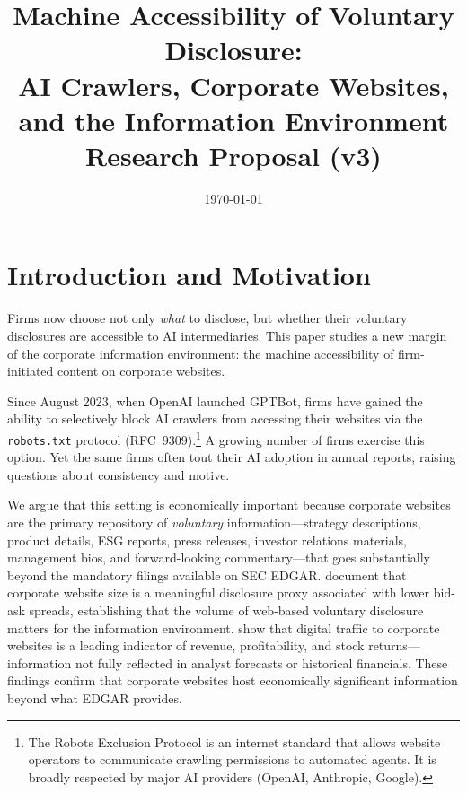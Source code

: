 \documentclass[12pt,a4paper]{article}
\title{\textbf{Machine Accessibility of Voluntary Disclosure: \\ AI Crawlers, Corporate Websites, and the Information Environment}\\
\vspace{0.5cm}
\large Research Proposal (v3)}
\author{}
\date{\today}
\begin{document}
\maketitle

\section{Introduction and Motivation}

Firms now choose not only \emph{what} to disclose, but whether their voluntary disclosures are accessible to AI intermediaries. This paper studies a new margin of the corporate information environment: the machine accessibility of firm-initiated content on corporate websites.

Since August 2023, when OpenAI launched GPTBot, firms have gained the ability to selectively block AI crawlers from accessing their websites via the \texttt{robots.txt} protocol (RFC~9309).\footnote{The Robots Exclusion Protocol is an internet standard that allows website operators to communicate crawling permissions to automated agents. It is broadly respected by major AI providers (OpenAI, Anthropic, Google).} A growing number of firms exercise this option. Yet the same firms often tout their AI adoption in annual reports, raising questions about consistency and motive.

We argue that this setting is economically important because corporate websites are the primary repository of \emph{voluntary} information---strategy descriptions, product details, ESG reports, press releases, investor relations materials, management bios, and forward-looking commentary---that goes substantially beyond the mandatory filings available on SEC EDGAR. \citet{BoullandBourveauBreuer2025} document that corporate website size is a meaningful disclosure proxy associated with lower bid-ask spreads, establishing that the volume of web-based voluntary disclosure matters for the information environment. \citet{ArmstrongKonchitchkiZhang2025} show that digital traffic to corporate websites is a leading indicator of revenue, profitability, and stock returns---information not fully reflected in analyst forecasts or historical financials. These findings confirm that corporate websites host economically significant information beyond what EDGAR provides.
\end{document}
